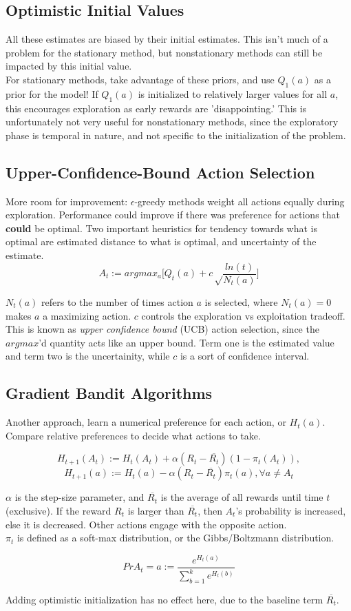 \documentclass[a4paper]{article}
\begin{document}
\subsection{Optimistic Initial Values}
All these estimates are biased by their initial estimates. This isn't much of a problem for the stationary method, but nonstationary methods can still be impacted by this initial value.\\

For stationary methods, take advantage of these priors, and use $Q_1(a)$ as a prior for the model! If $Q_1(a)$ is initialized to relatively larger values for all $a$, this encourages exploration as early rewards are 'disappointing.' This is unfortunately not very useful for nonstationary methods, since the exploratory phase is temporal in nature, and not specific to the initialization of the problem.

\subsection{Upper-Confidence-Bound Action Selection}
More room for improvement: $\epsilon$-greedy methods weight all actions equally during exploration. Performance could improve if there was preference for actions that \textbf{could} be optimal. Two important heuristics for tendency towards what is optimal are estimated distance to what is optimal, and uncertainty of the estimate. $$A_t := argmax_a\Bigg[Q_t(a) + c\sqrt\frac{ln(t)}{N_t(a)}\Bigg]$$

$N_t(a)$ refers to the number of times action $a$ is selected, where $N_t(a) = 0$ makes $a$ a maximizing action. $c$ controls the exploration vs exploitation tradeoff.\\

This is known as \textit{upper confidence bound} (UCB) action selection, since the $argmax$'d quantity acts like an upper bound. Term one is the estimated value and term two is the uncertainity, while $c$ is a sort of confidence interval.

\subsection{Gradient Bandit Algorithms}
Another approach, learn a numerical preference for each action, or $H_t(a)$. Compare relative preferences to decide what actions to take.

$$H_{t+1}(A_t) := H_t(A_t) + \alpha(R_t - \overline{R_t})(1 - \pi_t(A_t)),$$
$$H_{t+1}(a) := H_t(a) - \alpha(R_t - \overline{R_t})\pi_t(a), \forall a \neq A_t$$

$\alpha$ is the step-size parameter, and $\overline{R_t}$ is the average of all rewards until time $t$ (exclusive). If the reward $R_t$ is larger than $\overline{R_t}$, then $A_t$'s probability is increased, else it is decreased. Other actions engage with the opposite action.\\

$\pi_t$ is defined as a soft-max distribution, or the Gibbs/Boltzmann distribution.

$$Pr{A_t = a} := \frac{e^{H_t(a)}}{\sum_{b=1}^ke^{H_t(b)}}$$

Adding optimistic initialization has no effect here, due to the baseline term $\overline{R_t}$.
\end{document}
